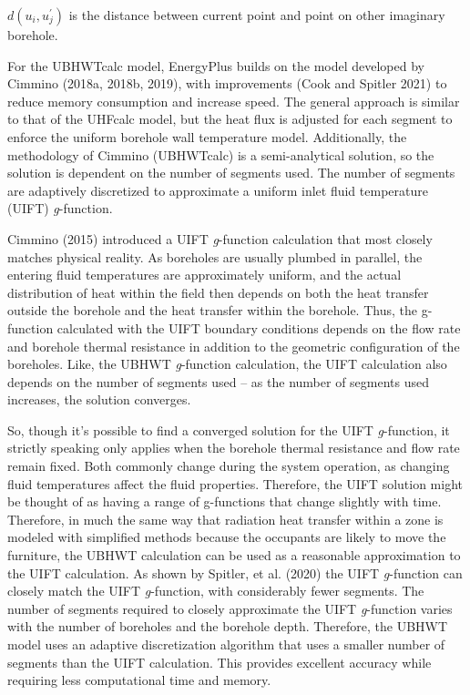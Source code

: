\(d(u_i, u_j^{'})\) is the distance between current point and point on other imaginary borehole.

For the UBHWTcalc model, EnergyPlus builds on the model developed by Cimmino (2018a, 2018b, 2019), with improvements (Cook and Spitler 2021) to reduce memory consumption and increase speed. The general approach is similar to that of the UHFcalc model, but the heat flux is adjusted for each segment to enforce the uniform borehole wall temperature model. Additionally, the methodology of Cimmino (UBHWTcalc) is a semi-analytical solution, so the solution is dependent on the number of segments used. The number of segments are adaptively discretized to approximate a uniform inlet fluid temperature (UIFT) \emph{g}-function. 

Cimmino (2015) introduced a UIFT \emph{g}-function calculation that most closely matches physical reality. As boreholes are usually plumbed in parallel, the entering fluid temperatures are approximately uniform, and the actual distribution of heat within the field then depends on both the heat transfer outside the borehole and the heat transfer within the borehole. Thus, the g-function calculated with the UIFT boundary conditions depends on the flow rate and borehole thermal resistance in addition to the geometric configuration of the boreholes. Like, the UBHWT \emph{g}-function calculation, the UIFT calculation also depends on the number of segments used – as the number of segments used increases, the solution converges. 

So, though it’s possible to find a converged solution for the UIFT \emph{g}-function, it strictly speaking only applies when the borehole thermal resistance and flow rate remain fixed. Both commonly change during the system operation, as changing fluid temperatures affect the fluid properties. Therefore, the UIFT solution might be thought of as having a range of g-functions that change slightly with time. Therefore, in much the same way that radiation heat transfer within a zone is modeled with simplified methods because the occupants are likely to move the furniture, the UBHWT calculation can be used as a reasonable approximation to the UIFT calculation. As shown by Spitler, et al. (2020) the UIFT \emph{g}-function can closely match the UIFT \emph{g}-function, with considerably fewer segments. The number of segments required to closely approximate the UIFT \emph{g}-function varies with the number of boreholes and the borehole depth. Therefore, the UBHWT model uses an adaptive discretization algorithm that uses a smaller number of segments than the UIFT calculation. This provides excellent accuracy while requiring less computational time and memory. 

